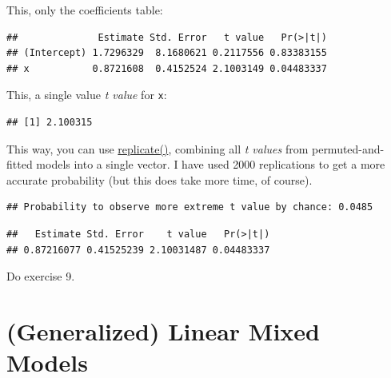 \documentclass[
]{book}
\newenvironment{Shaded}{\begin{snugshade}}{\end{snugshade}}
\newcommand{\FunctionTok}[1]{\textcolor[rgb]{0.00,0.00,0.00}{#1}}
\newcommand{\NormalTok}[1]{#1}
\newcommand{\SpecialCharTok}[1]{\textcolor[rgb]{0.00,0.00,0.00}{#1}}
\newcommand{\StringTok}[1]{\textcolor[rgb]{0.31,0.60,0.02}{#1}}
\begin{document}
This, only the coefficients table:

\begin{Shaded}
\end{Shaded}

\begin{verbatim}
##              Estimate Std. Error   t value   Pr(>|t|)
## (Intercept) 1.7296329  8.1680621 0.2117556 0.83383155
## x           0.8721608  0.4152524 2.1003149 0.04483337
\end{verbatim}

This, a single value \emph{t value} for \texttt{x}:

\begin{Shaded}
\end{Shaded}

\begin{verbatim}
## [1] 2.100315
\end{verbatim}

This way, you can use \href{https://stat.ethz.ch/R-manual/R-devel/library/base/html/lapply.html}{replicate()}, combining all \emph{t values} from permuted-and-fitted models into a single vector. I have used 2000 replications to get a more accurate probability (but this does take more time, of course).

\begin{verbatim}
## Probability to observe more extreme t value by chance: 0.0485
\end{verbatim}

\begin{verbatim}
##   Estimate Std. Error    t value   Pr(>|t|) 
## 0.87216077 0.41525239 2.10031487 0.04483337
\end{verbatim}

Do exercise 9.

\hypertarget{generalized-linear-mixed-models}{%
\section{(Generalized) Linear Mixed Models}\label{generalized-linear-mixed-models}}
\end{document}
